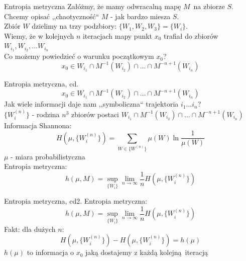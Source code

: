 \documentclass{beamer}
\begin{document}
\begin{frame}{Entropia metryczna} \pause
	Załóżmy, że mamy odwracalną mapę $M$ na zbiorze $S$.\pause \\
	Chcemy opisać ,,chaotyczność`` $M$ - jak bardzo miesza $S$.\\ \pause
	Zbiór $W$ dzielimy na trzy podzbiory: $\{W_1, W_2, W_3\} = \{W_i\}$.\\\pause
	Wiemy, że w kolejnych $n$ iteracjach mapy punkt $x_0$ trafiał do zbiorów
  $W_{i_1}, W_{i_2}, \dots W_{i_n}$\pause\\
	Co możemy powiedzieć o warunku początkowym $x_0$?\pause
	\begin{equation*}
		x_0 \in W_{i_1} \cap M^{-1}(W_{i_2}) \cap \dots \cap M^{-n+1}(W_{i_n})
	\end{equation*}
\end{frame}

\begin{frame}{Entropia metryczna, cd.}
	\begin{equation*}
		x_0 \in W_{i_1} \cap M^{-1}(W_{i_2}) \cap \dots \cap M^{-n+1}(W_{i_n})
	\end{equation*}
	Jak wiele informacji daje nam ,,symboliczna`` trajektoria $i_1 \dots i_n$?\\ \pause
	$\{W^{(n)}_i\}$ - rodzina $n^3$ zbiorów postaci
	$W_{i_1} \cap M^{-1}(W_{i_2}) \cap \dots \cap M^{-n+1}(W_{i_n})$ \pause \\
	Informacja Shannona:
	\begin{equation*}
		H(\mu, \{W^{(n)}_i\})=\sum_{W \in \{W^{(n)}\}}\mu(W)\ln\frac{1}{\mu(W)}
	\end{equation*}
	$\mu$ - miara probabilistyczna\\ \pause
	Entropia metryczna:
	\begin{equation*}
		h(\mu, M) = \sup_{\{W_i\}}\lim_{n\to\infty}\frac{1}{n}H(\mu, \{W_i^{(n)}\})
	\end{equation*}
\end{frame}

\begin{frame}{Entropia metryczna, cd2.}
	Entropia metryczna:
	\begin{equation*}
		h(\mu, M) = \sup_{\{W_i\}}\lim_{n\to\infty}\frac{1}{n}H(\mu, \{W_i^{(n)}\})
	\end{equation*}
	Fakt: dla dużych $n$: 
	\begin{equation*}
		H(\mu, \{W^{(n)}_i\}) - H(\mu, \{W^{(n)}_i\}) = h(\mu)
	\end{equation*}
 $h(\mu)$ to informacja o $x_0$ jaką dostajemy z każdą kolejną iteracją
\end{frame}
\end{document}
